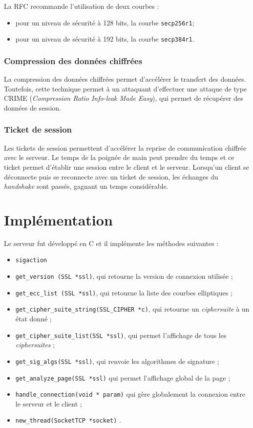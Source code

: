 La RFC recommande l'utilisation de deux courbes :
\begin{itemize}
\item pour un niveau de sécurité à 128 bits, la courbe \texttt{secp256r1};
\item pour un niveau de sécurité à 192 bits, la courbe \texttt{secp384r1}.
\end{itemize}



\subsubsection{Compression des données chiffrées}
La compression des données chiffrées permet d'accélérer le transfert des données. Toutefois, cette technique permet à un attaquant d'effectuer une attaque de type CRIME (\textit{Compression Ratio Info-leak Made Easy}), qui permet de récupérer des données de session. %


\subsubsection{Ticket de session}
Les tickets de session permettent d'accélérer la reprise de communication chiffrée avec le serveur. Le temps de la poignée de main peut prendre du temps et ce ticket permet d'établir une session entre le client et le serveur. Lorsqu'un client se déconnecte puis se reconnecte avec un ticket de session, les échanges du \textit{handshake} sont passés, gagnant un temps considérable. 



\section{Implémentation}
Le serveur fut développé en C et il implémente les méthodes suivantes :
\begin{itemize}
\item \verb+sigaction+
\item \verb+get_version (SSL *ssl)+, qui retourne la version de connexion utilisée ; 
\item \verb+get_ecc_list (SSL *ssl)+, qui retourne la liste des courbes elliptiques ; 
\item \verb+get_cipher_suite_string(SSL_CIPHER *c)+, qui retourne un \textit{ciphersuite} à un état donné ; 
\item \verb+get_cipher_suite_list(SSL *ssl)+, qui permet l'affichage de tous les \textit{ciphersuites} ; 
\item \verb+get_sig_algs(SSL *ssl)+, qui renvoie les algorithmes de signature ; 
\item \verb+get_analyze_page(SSL *ssl)+ qui permet l'affichage global de la page ;
\item \verb+handle_connection(void * param)+  qui gère globalement la connexion entre le serveur et le client ;
\item \verb+new_thread(SocketTCP *socket)+ .
\end{itemize}





